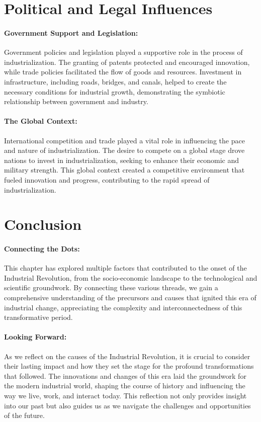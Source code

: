 \documentclass[a4paper,12pt]{book}
\begin{document}
\section*{Political and Legal Influences}

\paragraph{Government Support and Legislation:}
Government policies and legislation played a supportive role in the process of industrialization. The granting of patents protected and encouraged innovation, while trade policies facilitated the flow of goods and resources. Investment in infrastructure, including roads, bridges, and canals, helped to create the necessary conditions for industrial growth, demonstrating the symbiotic relationship between government and industry.

\paragraph{The Global Context:}
International competition and trade played a vital role in influencing the pace and nature of industrialization. The desire to compete on a global stage drove nations to invest in industrialization, seeking to enhance their economic and military strength. This global context created a competitive environment that fueled innovation and progress, contributing to the rapid spread of industrialization.

\section*{Conclusion}

\paragraph{Connecting the Dots:}
This chapter has explored multiple factors that contributed to the onset of the Industrial Revolution, from the socio-economic landscape to the technological and scientific groundwork. By connecting these various threads, we gain a comprehensive understanding of the precursors and causes that ignited this era of industrial change, appreciating the complexity and interconnectedness of this transformative period.

\paragraph{Looking Forward:}
As we reflect on the causes of the Industrial Revolution, it is crucial to consider their lasting impact and how they set the stage for the profound transformations that followed. The innovations and changes of this era laid the groundwork for the modern industrial world, shaping the course of history and influencing the way we live, work, and interact today. This reflection not only provides insight into our past but also guides us as we navigate the challenges and opportunities of the future.
\end{document}
